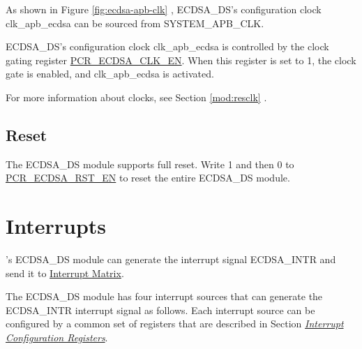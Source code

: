 \documentclass[main\_\_EN.tex]{subfiles}
\begin{document}
As shown in Figure \ref{fig:ecdsa-apb-clk} \textit{}, ECDSA\_DS's configuration clock clk\_apb\_ecdsa can be sourced from SYSTEM\_APB\_CLK.

ECDSA\_DS's configuration clock clk\_apb\_ecdsa is controlled by the clock gating register \hyperref[fielddesc:PCRECDSACLKEN]{PCR\_ECDSA\_CLK\_EN}. When this register is set to 1, the clock gate is enabled, and clk\_apb\_ecdsa is activated.

For more information about clocks, see Section \ref{mod:resclk} \textit{}.

\subsection{Reset}

The ECDSA\_DS module supports full reset. Write 1 and then 0 to \hyperref[fielddesc:PCRECDSARSTEN]{PCR\_ECDSA\_RST\_EN} to reset the entire ECDSA\_DS module.

\section{Interrupts}
\label{sec:ecdsa-interrupt}

\chipname{}'s ECDSA\_DS module can generate the interrupt signal ECDSA\_INTR and send it to \hyperref[mod:intmtrx]{Interrupt Matrix}.

The ECDSA\_DS module has four interrupt sources that can generate the ECDSA\_INTR interrupt signal as follows. Each interrupt source can be configured by a common set of registers that are described in Section \hyperref[interrupt-config-registers]{\textit{Interrupt Configuration Registers}}.
\end{document}
